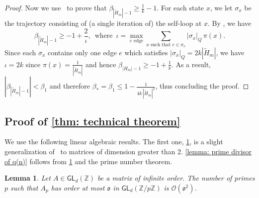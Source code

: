 \documentclass{article}
\def\O{\mathcal{O}}
\def\tH{\tilde{H}}
\def\Z{\mathbb{Z}}
\def\GL{\textsf{GL}}
\let\epsilon = \varepsilon
\theoremstyle{plain}
\newtheorem{lemma}[theorem]{Lemma}
\theoremstyle{definition}
\begin{document}
\begin{proof}
Now we use~\cite[Prop. 2]{diaconis1991geometric} to prove that $\beta_{|\tH_m|-1}\geq \frac1k-1$. For each state $x$, we let $\sigma_x$ be the trajectory consisting of (a single iteration of) the self-loop at $x$. By \cite[Prop. 2]{diaconis1991geometric}, we have
%
$$\beta_{|\tH_m|-1} \ge -1 + \frac2\iota,\enspace\textrm{where}\enspace\iota = \max_{e\text{ edge}}\sum_{x\textrm{ such that }e\in \sigma_x}|\sigma_x|_Q\, \pi(x).$$ 
%
Since each $\sigma_x$ contains only one edge $e$ which
satisfies $|\sigma_x|_Q = 2k|\tH_m|$, we have $\iota = 2k$ since $\pi(x) = \frac1{|\tH_m|}$ and hence $\beta_{|H_m|-1} \geq -1+\frac1k$. As a result, $|\beta_{|\tH_m|-1}| < \beta_1$ and therefore $\beta_* = \beta_1 \le 1-\frac1{4k\,|\tH_m|^2}$, thus concluding the proof.
%
\end{proof}



\subsection{Proof of \cref{thm: technical theorem}}\label{sec: proof of technnical theorem}

We use the following linear algebraic results. The first one, \cref{lm: matrices of small order}, is a slight generalization of~\cite[Lemma~11]{ParKurlberg2003} to matrices of dimension greater than $2$. \cref{lemma: prime divisor of q(n)} follows from \cref{lm: matrices of small order} and the prime number theorem.

\begin{lemma}\label{lm: matrices of small order}
Let $A\in\GL_d(\mathbb{Z})$ be a matrix of infinite order.  The number of primes $p$ such that $A_p$ has order at most $\mathfrak{o}$ in $\GL_d(\Z/p\Z)$ is $\O(\mathfrak{o}^2)$. 
\end{lemma}
\end{document}
